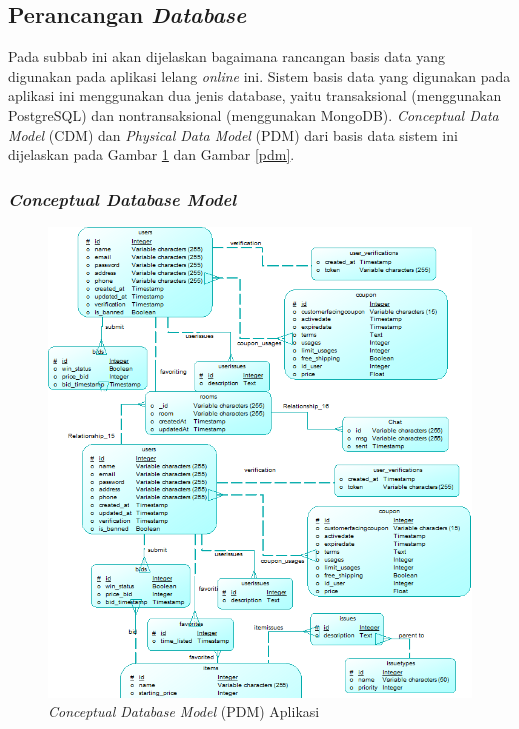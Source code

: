 
\subsection{Perancangan \textit{Database}}
Pada subbab ini akan dijelaskan bagaimana rancangan basis data yang digunakan pada aplikasi lelang \textit{online} ini. Sistem basis data yang digunakan pada aplikasi ini menggunakan dua jenis database, yaitu transaksional (menggunakan PostgreSQL) dan nontransaksional (menggunakan MongoDB). \textit{Conceptual Data Model} (CDM) dan \textit{Physical Data Model }(PDM) dari basis data sistem ini dijelaskan pada Gambar \ref{cdm} dan Gambar \ref{pdm}.
	\subsubsection{\textit{Conceptual Database Model}}
	\begin{figure}[H]
		\centering
		\includegraphics[width=\textwidth]{images/bab3/db/cdm.png}
		\caption{\textit{Conceptual Database Model} (PDM) Aplikasi}
		\label{cdm}
	\end{figure}
	
	
